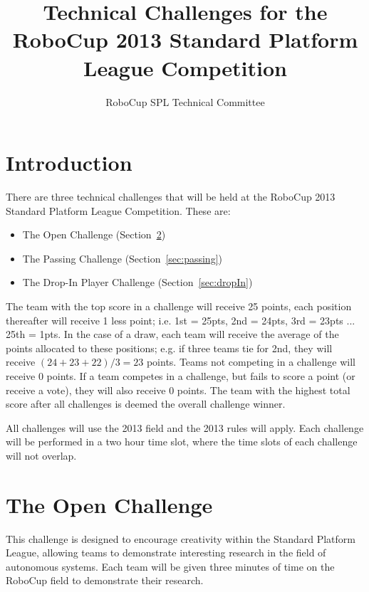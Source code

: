 \documentclass{article}
\begin{document}
\title{Technical Challenges for the RoboCup 2013 Standard Platform League Competition}

\author{RoboCup SPL Technical Committee}

\maketitle

\section{Introduction}
\label{sec:introduction}

There are three technical challenges that will be held at the RoboCup 
2013 Standard Platform League Competition. These are:

\begin{itemize}
\item The Open Challenge (Section~\ref{sec:open})
\item The Passing Challenge (Section~\ref{sec:passing})
\item The Drop-In Player Challenge (Section~\ref{sec:dropIn})
\end{itemize}

The team with the top score in a challenge will receive 25 points, each 
position thereafter will receive 1 less point; i.e. 1st = 25pts, 2nd = 24pts, 
3rd = 23pts ... 25th = 1pts. In the case of a draw, each team will receive 
the average of the points allocated to these positions; e.g. if three teams 
tie for 2nd, they will receive $(24+23+22)/3 = 23$ points. Teams not competing 
in a challenge will receive 0 points.  If a team competes in a challenge, but fails to 
score a point (or receive a vote), they will also receive 0 points. The team 
with the highest total score after all challenges is deemed the overall 
challenge winner.

All challenges will use the 2013 field and the 2013 rules will apply.  Each 
challenge will be performed in a two hour time slot, where the time slots of 
each challenge will not overlap.

\section{The Open Challenge}
\label{sec:open}
\newcommand{\openMinNum}{three}

This challenge is designed to encourage creativity within the Standard 
Platform League, allowing teams to demonstrate interesting research in 
the field of autonomous systems. Each team will be given \openMinNum{} 
minutes of time on the RoboCup field to demonstrate their research.
\end{document}
